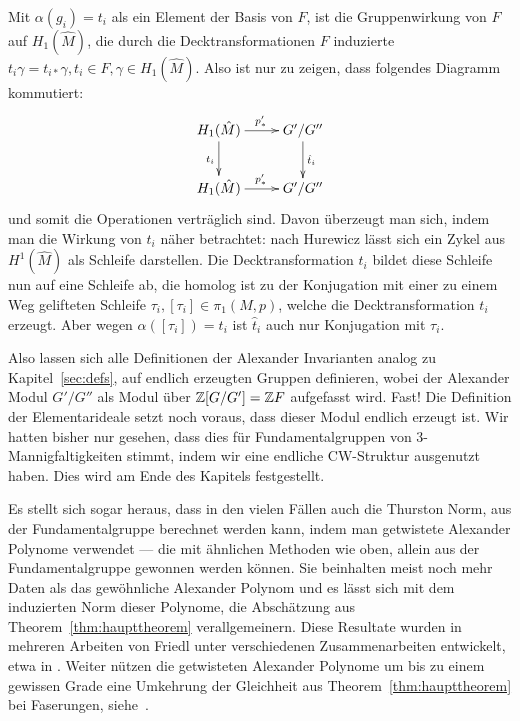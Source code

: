  Mit $\alpha(g_i)=t_i$ als ein Element der Basis von $F$, ist die Gruppenwirkung von $F$ auf $H_1(\hat M)$, die durch die Decktransformationen $F$ induzierte $t_i\gamma = t_{i*}\gamma,t_i \in F , \gamma \in H_1(\hat M)$. Also ist nur zu zeigen, dass folgendes Diagramm kommutiert:
\[
	\begin{xy}
		\xymatrix{H_1(\hat M) \ar[d]_{t_i} \ar[r]^{p'_*} & G'/G'' \ar[d]^{\hat t_i}\\
		H_1(\hat M)  \ar[r]^{p'_*} & G'/G'' }
	\end{xy}
\]
und somit die Operationen verträglich sind. Davon überzeugt man sich, indem man die Wirkung von $t_i$ näher betrachtet: nach Hurewicz lässt sich ein Zykel aus $H^1(\hat M)$ als Schleife darstellen. Die Decktransformation $t_i$ bildet diese Schleife nun auf eine Schleife ab, die homolog ist zu der Konjugation mit einer zu einem Weg gelifteten Schleife $\tau_i, [\tau_i] \in \pi_1(M,p)$, welche die Decktransformation $t_i$ erzeugt. Aber wegen $\alpha([\tau_i])=t_i$ ist $\hat t_i$ auch nur Konjugation mit $\tau_i$.

Also lassen sich alle Definitionen der Alexander Invarianten analog zu Kapitel~\ref{sec:defs}, auf endlich erzeugten Gruppen definieren, wobei der Alexander Modul $G'/G''$ als Modul über $\mathbb{Z} [G/G']= \mathbb{Z} F$ aufgefasst wird. Fast! Die Definition der Elementarideale setzt noch voraus, dass dieser Modul endlich erzeugt ist. Wir hatten bisher nur gesehen, dass dies für Fundamentalgruppen von 3-Mannigfaltigkeiten stimmt, indem wir eine endliche CW-Struktur ausgenutzt haben. Dies wird am Ende des Kapitels festgestellt.

\begin{bem}
Es stellt sich sogar heraus, dass in den vielen Fällen auch die Thurston Norm, aus der Fundamentalgruppe berechnet werden kann, indem man getwistete Alexander Polynome verwendet --- die mit ähnlichen Methoden wie oben, allein aus der Fundamentalgruppe gewonnen werden können. Sie beinhalten meist noch mehr Daten als das gewöhnliche Alexander Polynom und es lässt sich mit dem induzierten Norm dieser Polynome, die Abschätzung aus Theorem~\ref{thm:haupttheorem} verallgemeinern. Diese Resultate wurden in mehreren Arbeiten von Friedl unter verschiedenen Zusammenarbeiten entwickelt, etwa in \cite{Friedl.2011,Friedl.2008,Friedl.2008b,Friedl.2007,Friedl.2006,Friedl.2008c}. Weiter nützen die getwisteten Alexander Polynome um bis zu einem gewissen Grade eine Umkehrung der Gleichheit aus Theorem~\ref{thm:haupttheorem} bei Faserungen, siehe~\cite{Friedl.2006,Friedl.2008b}.
\end{bem}

